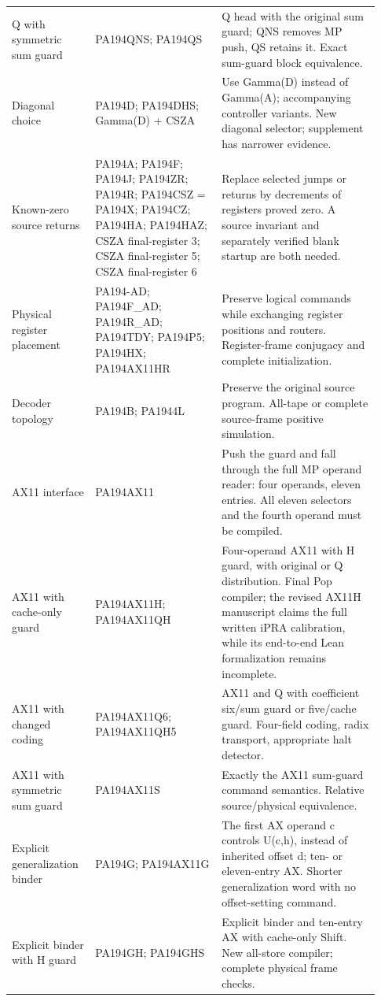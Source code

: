 \begin{longtable}{p{0.21\linewidth}p{0.32\linewidth}p{0.40\linewidth}}
Q with symmetric sum guard & PA194QNS; PA194QS & Q head with the original sum guard; QNS removes MP push, QS retains it. Exact sum-guard block equivalence.\\[4pt]
Diagonal choice & PA194D; PA194DHS; Gamma(D) + CSZA & Use Gamma(D) instead of Gamma(A); accompanying controller variants. New diagonal selector; supplement has narrower evidence.\\[4pt]
Known-zero source returns & PA194A; PA194F; PA194J; PA194ZR; PA194R; PA194CSZ = PA194X; PA194CZ; PA194HA; PA194HAZ; CSZA final-register 3; CSZA final-register 5; CSZA final-register 6 & Replace selected jumps or returns by decrements of registers proved zero. A source invariant and separately verified blank startup are both needed.\\[4pt]
Physical register placement & PA194-AD; PA194F\_AD; PA194R\_AD; PA194TDY; PA194P5; PA194HX; PA194AX11HR & Preserve logical commands while exchanging register positions and routers. Register-frame conjugacy and complete initialization.\\[4pt]
Decoder topology & PA194B; PA1944L & Preserve the original source program. All-tape or complete source-frame positive simulation.\\[4pt]
AX11 interface & PA194AX11 & Push the guard and fall through the full MP operand reader: four operands, eleven entries. All eleven selectors and the fourth operand must be compiled.\\[4pt]
AX11 with cache-only guard & PA194AX11H; PA194AX11QH & Four-operand AX11 with H guard, with original or Q distribution. Final Pop compiler; the revised AX11H manuscript claims the full written iPRA calibration, while its end-to-end Lean formalization remains incomplete.\\[4pt]
AX11 with changed coding & PA194AX11Q6; PA194AX11QH5 & AX11 and Q with coefficient six/sum guard or five/cache guard. Four-field coding, radix transport, appropriate halt detector.\\[4pt]
AX11 with symmetric sum guard & PA194AX11S & Exactly the AX11 sum-guard command semantics. Relative source/physical equivalence.\\[4pt]
Explicit generalization binder & PA194G; PA194AX11G & The first AX operand c controls U(c,h), instead of inherited offset d; ten- or eleven-entry AX. Shorter generalization word with no offset-setting command.\\[4pt]
Explicit binder with H guard & PA194GH; PA194GHS & Explicit binder and ten-entry AX with cache-only Shift. New all-store compiler; complete physical frame checks.\\[4pt]

\end{longtable}

